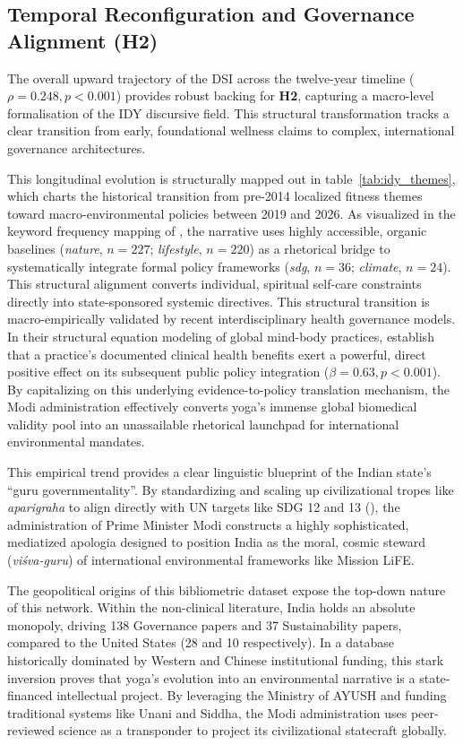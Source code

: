 \documentclass[11pt]{article}
\begin{document}
\subsection{Temporal Reconfiguration and Governance Alignment (H2)}
The overall upward trajectory of the DSI across the twelve-year timeline ($\rho = 0.248, p < 0.001$) provides robust backing for \textbf{H2}, capturing a macro-level formalisation of the IDY discursive field. This structural transformation tracks a clear transition from early, foundational wellness claims to complex, international governance architectures. 

This longitudinal evolution is structurally mapped out in {table~\ref{tab:idy_themes}}, which charts the historical transition from pre-2014 localized fitness themes toward macro-environmental policies between 2019 and 2026. As visualized in the keyword frequency mapping of , the narrative uses highly accessible, organic baselines (\textit{nature}, $n=227$; \textit{lifestyle}, $n=220$) as a rhetorical bridge to systematically integrate formal policy frameworks (\textit{sdg}, $n=36$; \textit{climate}, $n=24$). This structural alignment converts individual, spiritual self-care constraints directly into state-sponsored systemic directives. This structural transition is macro-empirically validated by recent interdisciplinary health governance models. In their structural equation modeling of global mind-body practices, \citet{zhou2026yoga} establish that a practice's documented clinical health benefits exert a powerful, direct positive effect on its subsequent public policy integration ($\beta = 0.63, p < 0.001$). By capitalizing on this underlying evidence-to-policy translation mechanism, the Modi administration effectively converts yoga's immense global biomedical validity pool into an unassailable rhetorical launchpad for international environmental mandates.

 This empirical trend provides a clear linguistic blueprint of the Indian state's ``guru governmentality''. By standardizing and scaling up civilizational tropes like \textit{aparigraha} to align directly with UN targets like SDG 12 and 13 (), the administration of Prime Minister Modi constructs a highly sophisticated, mediatized apologia designed to position India as the moral, cosmic steward (\textit{vi\'{s}va-guru}) of international environmental frameworks like Mission LiFE.

The geopolitical origins of this bibliometric dataset expose the top-down nature of this network. Within the non-clinical literature, India holds an absolute monopoly, driving 138 Governance papers and 37 Sustainability papers, compared to the United States (28 and 10 respectively). In a database historically dominated by Western and Chinese institutional funding, this stark inversion proves that yoga's evolution into an environmental narrative is a state-financed intellectual project. By leveraging the Ministry of AYUSH and funding traditional systems like Unani and Siddha, the Modi administration uses peer-reviewed science as a transponder to project its civilizational statecraft globally.
\end{document}
